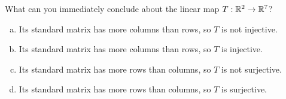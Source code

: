 \begin{applicationActivities}
\begin{activity}{2}
  What can you immediately conclude about the linear map \(T:\mathbb{R}^2\to\mathbb{R}^7\)?
  \begin{enumerate}[a)]
    \item Its standard matrix has more columns than rows, so \(T\) is not
    injective.
    \item Its standard matrix has more columns than rows, so \(T\) is
    injective.
    \item Its standard matrix has more rows than columns, so \(T\) is not
    surjective.
    \item Its standard matrix has more rows than columns, so \(T\) is
    surjective.
  \end{enumerate}
\end{activity}


\end{applicationActivities}
